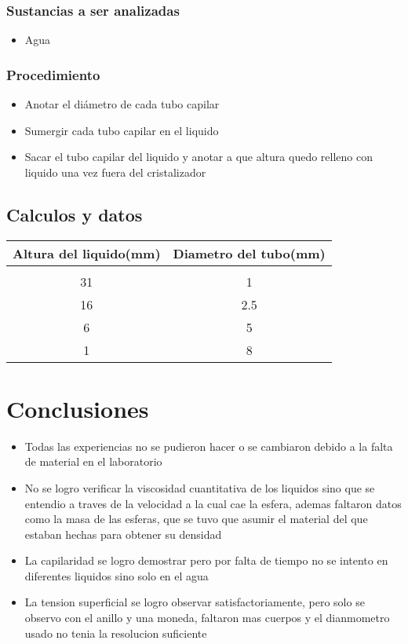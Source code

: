\documentclass[11pt, letterpaper]{article}
\begin{document}
\subsubsection{Sustancias a ser analizadas}
\begin{itemize}
	\item Agua
\end{itemize}
\subsubsection{Procedimiento}
\begin{itemize}
	\item Anotar el diámetro de cada tubo capilar
	\item Sumergir cada tubo capilar en el liquido 
	\item Sacar el tubo capilar del liquido y anotar a que altura quedo relleno con liquido una vez fuera del cristalizador
\end{itemize}
\subsection{Calculos y datos}
  \begin{center}
    \begin{tabular}{|c|c|}
    \toprule
    \rowcolor[rgb]{ .776,  .878,  .706} Altura del liquido(mm) & Diametro del tubo(mm) \\
    \midrule
    \rowcolor[rgb]{ 1,  1,  0} \multicolumn{2}{|c|}{Agua} \\
    \midrule
    31    & 1 \\
    \midrule
    16    & 2.5 \\
    \midrule
    6     & 5 \\
    \midrule
    1     & 8 \\
    \bottomrule
    \end{tabular}%
  \end{center}
\section{Conclusiones}
\begin{itemize}
	\item Todas las experiencias no se pudieron hacer o se cambiaron debido a la falta de material en el laboratorio
	\item No se logro verificar la viscosidad cuantitativa de los liquidos sino que se entendio a traves de la velocidad a la cual cae la esfera, ademas faltaron datos como la masa de las esferas, que se tuvo que asumir el material del que estaban hechas para obtener su densidad
	\item La capilaridad se logro demostrar pero por falta de tiempo no se intento en diferentes liquidos sino solo en el agua
	\item La tension superficial se logro observar satisfactoriamente, pero solo se observo con el anillo y una moneda, faltaron mas cuerpos y el dianmometro usado no tenia la resolucion suficiente
\end{itemize}
\end{document}
